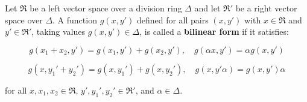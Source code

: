 Let $\mathfrak{R}$ be a left vector space over a division ring $\Delta$ and let $\mathfrak{R}'$ be a right vector space over $\Delta$. A function $g(x, y')$ defined for all pairs $(x, y')$ with $x \in \mathfrak{R}$ and $y' \in \mathfrak{R}'$, taking values $g(x, y') \in \Delta$, is called a \textbf{bilinear form} if it satisfies:

$$g(x_1 + x_2, y') = g(x_1, y') + g(x_2, y'), \quad g(\alpha x, y') = \alpha g(x, y')$$

$$g(x, y_1' + y_2') = g(x, y_1') + g(x, y_2'), \quad g(x, y'\alpha) = g(x, y')\alpha$$

for all $x, x_1, x_2 \in \mathfrak{R}$, $y', y_1', y_2' \in \mathfrak{R}'$, and $\alpha \in \Delta$.
